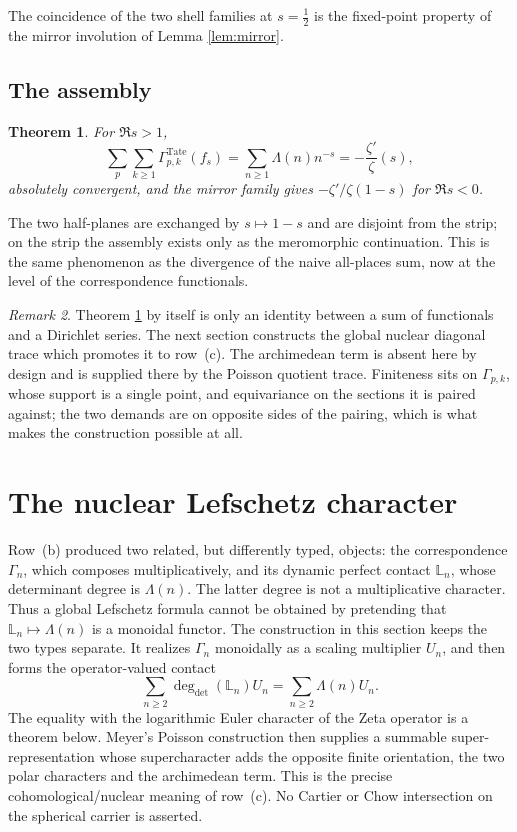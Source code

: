 \documentclass[11pt]{amsart}
\newtheorem{theorem}{Theorem}[section]
\theoremstyle{definition}
\theoremstyle{remark}
\newtheorem{remark}[theorem]{Remark}
\begin{document}
The coincidence of the two shell families at $s=\tfrac12$ is the fixed-point
property of the mirror involution of Lemma \ref{lem:mirror}.

\subsection{The assembly}

\begin{theorem}\label{thm:assembly}
For $\Re s>1$,
\[
 \sum_p\sum_{k\ge1}\Gamma^{\mathrm{Tate}}_{p,k}(f_s)
 =\sum_{n\ge1}\Lambda(n)n^{-s}
 =-\frac{\zeta'}{\zeta}(s),
\]
absolutely convergent, and the mirror family gives $-\zeta'/\zeta(1-s)$ for
$\Re s<0$.
\end{theorem}

The two half-planes are exchanged by $s\mapsto1-s$ and are disjoint from the
strip; on the strip the assembly exists only as the meromorphic
continuation.  This is the same phenomenon as the divergence of the naive
all-places sum, now at the level of the correspondence functionals.

\begin{remark}
Theorem \ref{thm:assembly} by itself is only an identity between a sum of
functionals and a Dirichlet series.  The next section constructs the global
nuclear diagonal trace which promotes it to row~(c).  The archimedean term is
absent here by design and is supplied there by the Poisson quotient trace.
Finiteness sits on $\Gamma_{p,k}$, whose support is a single point, and
equivariance on the sections it is paired against; the two demands are on
opposite sides of the pairing, which is what makes the construction possible
at all.
\end{remark}


\section{The nuclear Lefschetz character}
\label{sec:rowc}

Row~(b) produced two related, but differently typed, objects: the
correspondence $\Gamma_n$, which composes multiplicatively, and its dynamic
perfect contact $\mathbb L_n$, whose determinant degree is $\Lambda(n)$.
The latter degree is not a multiplicative character.  Thus a global
Lefschetz formula cannot be obtained by pretending that
$\mathbb L_n\mapsto\Lambda(n)$ is a monoidal functor.  The construction in
this section keeps the two types separate.  It realizes $\Gamma_n$
monoidally as a scaling multiplier $U_n$, and then forms the operator-valued
contact
\[
 \sum_{n\geq2}\deg_{\det}(\mathbb L_n)U_n
 =\sum_{n\geq2}\Lambda(n)U_n.
\]
The equality with the logarithmic Euler character of the Zeta operator is a
theorem below.  Meyer's Poisson construction then supplies a summable
super-representation whose supercharacter adds the opposite finite
orientation, the two polar characters and the archimedean term.  This is
the precise cohomological/nuclear meaning of row~(c).  No Cartier or Chow
intersection on the spherical carrier is asserted.
\end{document}
